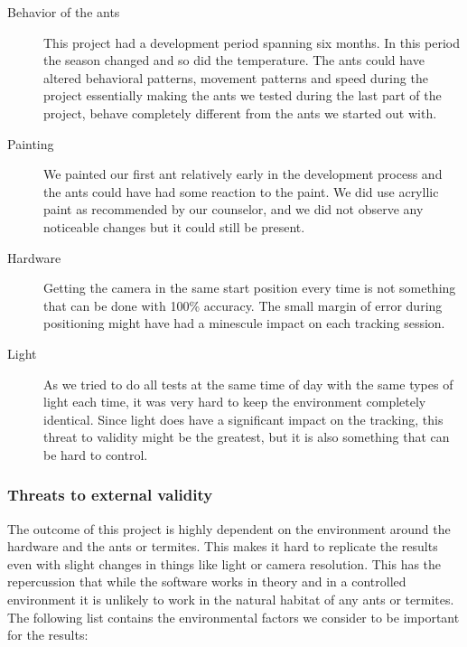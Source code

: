 \begin{description}
\item[Behavior of the ants] This project had a development period spanning six months. In this period the season changed and so did the temperature. The ants could have altered behavioral patterns, movement patterns and speed during the project essentially making the ants we tested during the last part of the project, behave completely different from the ants we started out with. \\

\item[Painting] We painted our first ant relatively early in the development process and the ants could have had some reaction to the paint. We did use acryllic paint as recommended by our counselor, and we did not observe any noticeable changes but it could still be present. \\

\item[Hardware] Getting the camera in the same start position every time is not something that can be done with 100\% accuracy. The small margin of error during positioning might have had a minescule impact on each tracking session. \\

\item[Light] As we tried to do all tests at the same time of day with the same types of light each time, it was very hard to keep the environment completely identical. Since light does have a significant impact on the tracking, this threat to validity might be the greatest, but it is also something that can be hard to control. \\    
\end{description}

\subsubsection{Threats to external validity} \mbox{}\par

The outcome of this project is highly dependent on the environment around the hardware and the ants or termites. This makes it hard to replicate the results even with slight changes in things like light or camera resolution. This has the repercussion that while the software works in theory and in a controlled environment it is unlikely to work in the natural habitat of any ants or termites. The following list contains the environmental factors we consider to be important for the results:

